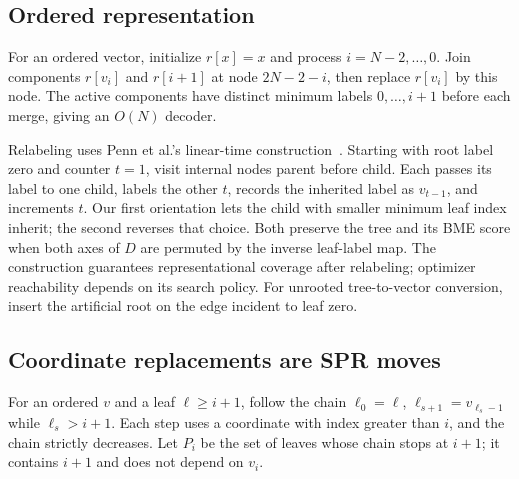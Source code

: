 \subsection{Ordered representation}
\label{sec:gauge}

For an ordered vector, initialize $r[x]=x$ and process $i=N-2,\ldots,0$.
Join components $r[v_i]$ and $r[i+1]$ at node $2N-2-i$, then replace $r[v_i]$ by this node.
The active components have distinct minimum labels $0,\ldots,i+1$ before each merge, giving an $O(N)$ decoder.

Relabeling uses Penn et al.'s linear-time construction~\cite[Lemmas~0.9--0.11]{penn2023gradme}.
Starting with root label zero and counter $t=1$, visit internal nodes parent before child.
Each passes its label to one child, labels the other $t$, records the inherited label as $v_{t-1}$, and increments $t$.
Our first orientation lets the child with smaller minimum leaf index inherit; the second reverses that choice.
Both preserve the tree and its BME score when both axes of $D$ are permuted by the inverse leaf-label map.
The construction guarantees representational coverage after relabeling; optimizer reachability depends on its search policy.
For unrooted tree-to-vector conversion, insert the artificial root on the edge incident to leaf zero.

\subsection{Coordinate replacements are SPR moves}
\label{sec:coord_spr}

For an ordered $v$ and a leaf $\ell\geq i+1$, follow the chain $\ell_0=\ell$, $\ell_{s+1}=v_{\ell_s-1}$ while $\ell_s>i+1$.
Each step uses a coordinate with index greater than $i$, and the chain strictly decreases.
Let $P_i$ be the set of leaves whose chain stops at $i+1$; it contains $i+1$ and does not depend on $v_i$.

